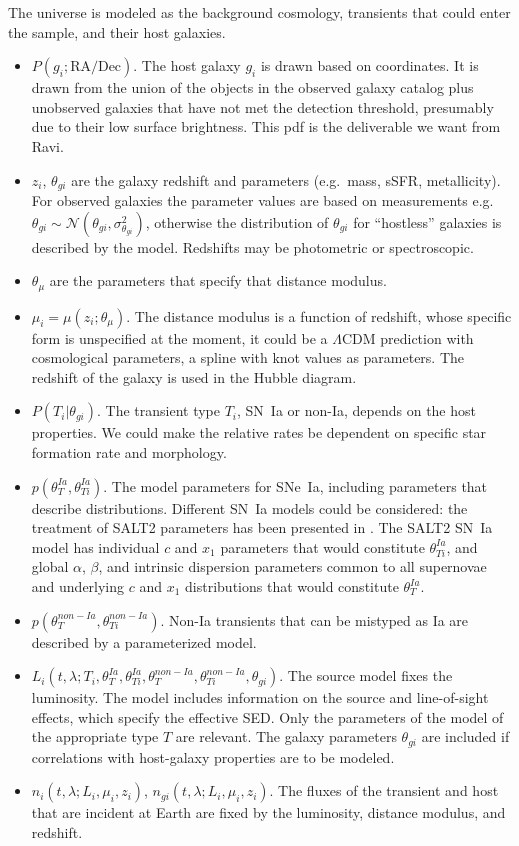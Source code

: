 \documentclass[preprint]{aastex}
\begin{document}
The universe is modeled as the background cosmology, transients that could
enter the sample, and their host galaxies.
\begin{itemize}
\item $P(g_i; {\text{RA}}/{\text{Dec}})$. The host galaxy $g_i$
is drawn based on coordinates.
It is drawn from
the union of the objects in the observed galaxy catalog
plus unobserved galaxies that have not
met the detection threshold, presumably due to their low surface brightness.
This pdf is
the deliverable we want from Ravi.
\item $z_i$, $\theta_{gi}$ are the galaxy redshift and parameters (e.g.\ mass, sSFR, metallicity).
For observed galaxies the parameter values are based on measurements e.g.\ $\theta_{gi} \sim \mathcal{N}({\theta}_{gi},\sigma^2_{{\theta}_{gi}})$, otherwise the distribution
of $\theta_{gi}$ for ``hostless'' galaxies is described by the model.
Redshifts may be photometric or spectroscopic.
\item $\theta_\mu$ are the parameters that specify that distance modulus.
\item $\mu_i=\mu(z_i; \theta_\mu)$.  The distance modulus is a function of redshift,
whose specific form is unspecified at the moment,  it could
be a $\Lambda$CDM prediction with cosmological parameters, a spline with knot values
as parameters.
The redshift of the galaxy is used in the Hubble diagram.
\item $P(T_i | \theta_{gi})$.  The transient type $T_i$, SN~Ia or non-Ia, depends
on the host properties.  We could make the relative rates be dependent
on specific star formation rate and morphology.
\item $p(\theta_T^{Ia}, \theta_{Ti}^{Ia})$.  The model parameters for SNe~Ia, including
parameters that describe distributions.
Different SN~Ia models could be considered: the treatment of SALT2 parameters
has been presented in \citet{2011MNRAS.418.2308M}.
The SALT2 SN~Ia
model has individual $c$ and $x_1$ parameters that would constitute $\theta_{Ti}^{Ia}$,
and global $\alpha$, $\beta$, and intrinsic dispersion  parameters  common to all supernovae
 and  underlying  $c$ and $x_1$ distributions that would constitute $\theta_T^{Ia}$.
\item $p(\theta_T^{non-Ia}, \theta_{Ti}^{non-Ia})$.  Non-Ia transients
that can be mistyped as Ia are described by a parameterized model.
\item $L_i(t,\lambda; T_i, \theta_T^{Ia}, \theta_{Ti}^{Ia}, \theta_T^{non-Ia}, \theta_{Ti}^{non-Ia},
\theta_{gi})$.  The source model fixes
the luminosity. The  model includes  information on the
source and line-of-sight effects, which specify the effective SED.   Only the
parameters of the model of the appropriate type $T$ are relevant.  The galaxy parameters
$\theta_{gi}$ are included if correlations with host-galaxy properties are to be modeled.
\item $n_i(t,\lambda; L_i, \mu_i, z_i)$, $n_{gi}(t,\lambda; L_i, \mu_i, z_i)$.  The  fluxes of
the transient and host that are incident at Earth
are fixed by the luminosity, distance modulus, and redshift.
\end{itemize}
\end{document}
